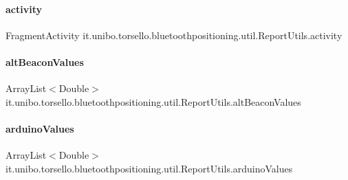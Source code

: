 \paragraph{\texorpdfstring{activity}{activity}}
{\footnotesize\ttfamily Fragment\+Activity it.\+unibo.\+torsello.\+bluetoothpositioning.\+util.\+Report\+Utils.\+activity\hspace{0.3cm}{\ttfamily [private]}}

\hypertarget{classit_1_1unibo_1_1torsello_1_1bluetoothpositioning_1_1util_1_1ReportUtils_a6e72cc0d840390d44e6cbccece68e240_a6e72cc0d840390d44e6cbccece68e240}{}\label{classit_1_1unibo_1_1torsello_1_1bluetoothpositioning_1_1util_1_1ReportUtils_a6e72cc0d840390d44e6cbccece68e240_a6e72cc0d840390d44e6cbccece68e240} 
\paragraph{\texorpdfstring{alt\+Beacon\+Values}{altBeaconValues}}
{\footnotesize\ttfamily Array\+List$<$Double$>$ it.\+unibo.\+torsello.\+bluetoothpositioning.\+util.\+Report\+Utils.\+alt\+Beacon\+Values\hspace{0.3cm}{\ttfamily [private]}}

\hypertarget{classit_1_1unibo_1_1torsello_1_1bluetoothpositioning_1_1util_1_1ReportUtils_a3557dcc1662461b46fcd4d18eee9780e_a3557dcc1662461b46fcd4d18eee9780e}{}\label{classit_1_1unibo_1_1torsello_1_1bluetoothpositioning_1_1util_1_1ReportUtils_a3557dcc1662461b46fcd4d18eee9780e_a3557dcc1662461b46fcd4d18eee9780e} 
\paragraph{\texorpdfstring{arduino\+Values}{arduinoValues}}
{\footnotesize\ttfamily Array\+List$<$Double$>$ it.\+unibo.\+torsello.\+bluetoothpositioning.\+util.\+Report\+Utils.\+arduino\+Values\hspace{0.3cm}{\ttfamily [private]}}

